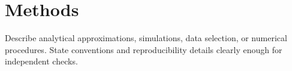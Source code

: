 \section{Methods}
\label{sec:methods}

Describe analytical approximations, simulations, data selection, or numerical procedures.
State conventions and reproducibility details clearly enough for independent checks.

